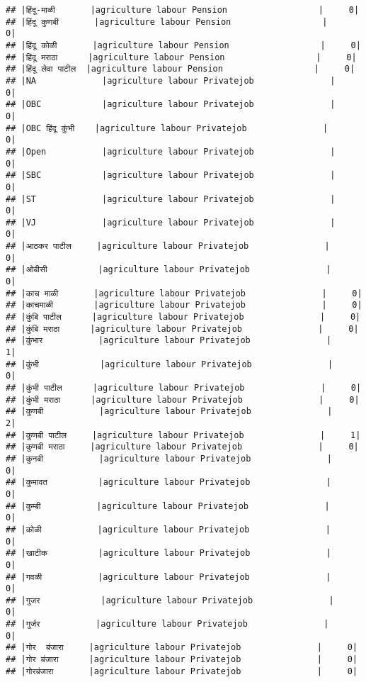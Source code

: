\documentclass[
]{article}
\begin{document}
\begin{verbatim}
## |हिंदू-माळी       |agriculture labour Pension                  |     0|
## |हिंदू कुणबी       |agriculture labour Pension                  |     0|
## |हिंदू कोळी       |agriculture labour Pension                  |     0|
## |हिंदू मराठा      |agriculture labour Pension                  |     0|
## |हिंदू लेवा पाटील  |agriculture labour Pension                  |     0|
## |NA             |agriculture labour Privatejob               |     0|
## |OBC            |agriculture labour Privatejob               |     0|
## |OBC हिंदू कुंभी    |agriculture labour Privatejob               |     0|
## |Open           |agriculture labour Privatejob               |     0|
## |SBC            |agriculture labour Privatejob               |     0|
## |ST             |agriculture labour Privatejob               |     0|
## |VJ             |agriculture labour Privatejob               |     0|
## |आठकर पाटील     |agriculture labour Privatejob               |     0|
## |ओबीसी          |agriculture labour Privatejob               |     0|
## |काच माळी       |agriculture labour Privatejob               |     0|
## |काचमाळी        |agriculture labour Privatejob               |     0|
## |कुंबि पाटील      |agriculture labour Privatejob               |     0|
## |कुंबि मराठा      |agriculture labour Privatejob               |     0|
## |कुंभार           |agriculture labour Privatejob               |     1|
## |कुंभी            |agriculture labour Privatejob               |     0|
## |कुंभी पाटील      |agriculture labour Privatejob               |     0|
## |कुंभी मराठा      |agriculture labour Privatejob               |     0|
## |कुणबी           |agriculture labour Privatejob               |     2|
## |कुणबी पाटील     |agriculture labour Privatejob               |     1|
## |कुणबी मराठा     |agriculture labour Privatejob               |     0|
## |कुनबी           |agriculture labour Privatejob               |     0|
## |कुमावत          |agriculture labour Privatejob               |     0|
## |कुम्बी           |agriculture labour Privatejob               |     0|
## |कोळी           |agriculture labour Privatejob               |     0|
## |खाटीक          |agriculture labour Privatejob               |     0|
## |गवळी           |agriculture labour Privatejob               |     0|
## |गुजर            |agriculture labour Privatejob               |     0|
## |गुर्जर           |agriculture labour Privatejob               |     0|
## |गोर  बंजारा     |agriculture labour Privatejob               |     0|
## |गोर बंजारा      |agriculture labour Privatejob               |     0|
## |गोरबंजारा       |agriculture labour Privatejob               |     0|

\end{verbatim}
\end{document}
